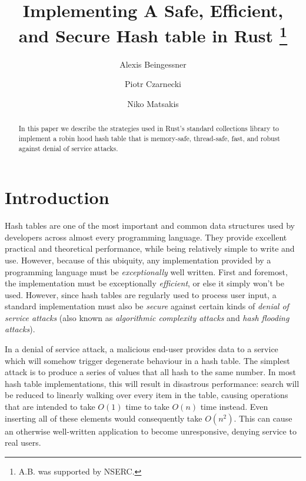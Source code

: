 \documentclass{cccg13}
\title{Implementing A Safe, Efficient, and Secure Hash table in Rust \thanks{A.B. was supported by NSERC.}}
\author{
Alexis Beingessner\footnotemark[2]
\and
Piotr Czarnecki
\and
Niko Matsakis
}
\begin{document}
\thispagestyle{empty}
\maketitle


\begin{abstract}
In this paper we describe the strategies used in Rust's standard collections library to implement a robin hood hash table that is memory-safe, thread-safe, fast, and robust against denial of service attacks.
\end{abstract}







\section{Introduction}   \label{secintro}

Hash tables are one of the most important and common data structures used by
developers across almost every programming language. They provide excellent
practical and theoretical performance, while being relatively simple to write
and use. However, because of this ubiquity, any implementation provided by a
programming language must be \emph{exceptionally} well written. First and
foremost, the implementation must be exceptionally \emph{efficient}, or else
it simply won't be used. However, since hash tables are regularly used to
process user input, a standard implementation must also be \emph{secure}
against certain kinds of \emph{denial of service attacks} (also known as
\emph{algorithmic complexity attacks} and \emph{hash flooding attacks}).

In a denial of service attack, a malicious end-user provides data to a service
which will somehow trigger degenerate behaviour in a hash table. The simplest
attack is to produce a series of values that all hash to the same number. In
most hash table implementations, this will result in disastrous performance:
search will be reduced to linearly walking over every item in the table,
causing operations that are intended to take $O(1)$ time to take $O(n)$ time
instead. Even  inserting all of these elements would consequently take
$O(n^2)$. This can cause an otherwise well-written application to become
unresponsive, denying service to real users.
\end{document}
